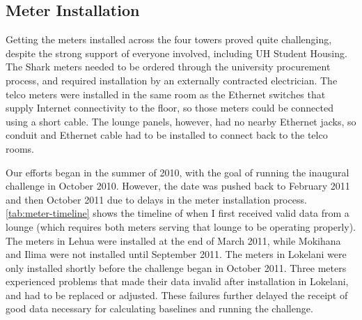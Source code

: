 \subsection{Meter Installation}
\label{sec:meter-installation}

Getting the meters installed across the four towers proved quite challenging, despite the strong support of everyone involved, including UH \Manoa Student Housing. The Shark meters needed to be ordered through the university procurement process, and required installation by an externally contracted electrician. The telco meters were installed in the same room as the Ethernet switches that supply Internet connectivity to the floor, so those meters could be connected using a short cable. The lounge panels, however, had no nearby Ethernet jacks, so conduit and Ethernet cable had to be installed to connect back to the telco rooms.

Our efforts began in the summer of 2010, with the goal of running the inaugural challenge in October 2010. However, the date was pushed back to February 2011 and then October 2011 due to delays in the meter installation process. \autoref{tab:meter-timeline} shows the timeline of when I first received valid data from a lounge (which requires both meters serving that lounge to be operating properly). The meters in Lehua were installed at the end of March 2011, while Mokihana and Ilima were not installed until September 2011. The meters in Lokelani were only installed shortly before the challenge began in October 2011. Three meters experienced problems that made their data invalid after installation in Lokelani, and had to be replaced or adjusted. These failures further delayed the receipt of good data necessary for calculating baselines and running the challenge.

